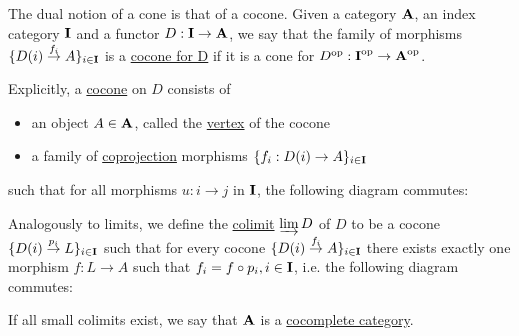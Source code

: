 \begin{definition}\label{def:categorical_cocone}\cite[definition 5.2.1]{Leinster2014}
  The dual notion of a cone is that of a cocone. Given a category $\operatorname{\mathbf{A}}$, an index category $\operatorname{\mathbf{I}}$ and a functor $D: \operatorname{\mathbf{I}} \to \operatorname{\mathbf{A}}$, we say that the family of morphisms $\{ D(i) \overset {f_i} \to A \}_{i \in \operatorname{\mathbf{I}}}$ is a \uline{cocone for D} if it is a cone for $D^{\operatorname{op}}: \operatorname{\mathbf{I}}^{\operatorname{op}} \to \operatorname{\mathbf{A}}^{\operatorname{op}}$.

  Explicitly, a \uline{cocone} on $D$ consists of
  \begin{itemize}
    \item an object $A \in \operatorname{\mathbf{A}}$, called the \uline{vertex} of the cocone
    \item a family of \uline{coprojection} morphisms $\{ f_i: D(i) \to A \}_{i \in \operatorname{\mathbf{I}}}$
  \end{itemize}
  such that for all morphisms $u: i \to j$ in $\operatorname{\mathbf{I}}$, the following diagram commutes:
  \begin{center}
  \end{center}
\end{definition}

\begin{definition}\label{def:categorical_colimit}\cite[definition 5.1.19(b)]{Leinster2014}
  Analogously to limits, we define the \uline{colimit} $\varinjlim D$ of $D$ to be a cocone $\{ D(i) \overset {p_i} \to L \}_{i \in \operatorname{\mathbf{I}}}$ such that for every cocone $\{ D(i) \overset {f_i} \to A \}_{i \in \operatorname{\mathbf{I}}}$ there exists exactly one morphism $f: L \to A$ such that $f_i = f \circ p_i, i \in \operatorname{\mathbf{I}}$, i.e. the following diagram commutes:
  \begin{center}
  \end{center}

  If all small colimits exist, we say that $\operatorname{\mathbf{A}}$ is a \uline{cocomplete category}.
\end{definition}

